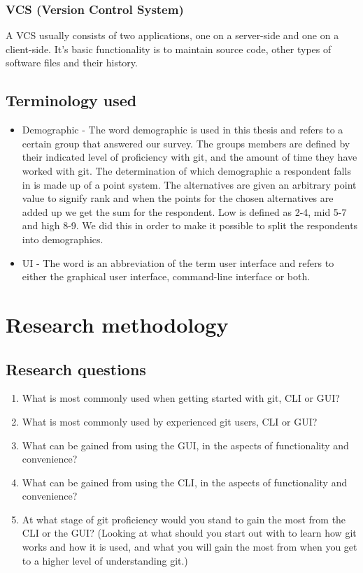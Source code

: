 \documentclass[a4paper,oneside]{bth} %
\begin{document}
			\subsection{VCS (Version Control System)}
			A VCS usually consists of two applications, one on a server-side and one on a client-side.
			It's basic functionality is to maintain source code, other types of software files and their history.\cite{FoundationVCforWebDevs}
			
			\section{Terminology used}
				\begin{itemize}
					\item Demographic - The word demographic is used in this thesis and refers to a certain group that answered our survey. The groups members are defined by their indicated level of proficiency with git, and the amount of time they have worked with git. The determination of which demographic a respondent falls in is made up of a point system. The alternatives are given an arbitrary point value to signify rank and when the points for the chosen alternatives are added up we get the sum for the respondent. Low is defined as 2-4, mid 5-7 and high 8-9. We did this in order to make it possible to split the respondents into demographics.
					\item UI - The word is an abbreviation of the term user interface and refers to either the graphical user interface, command-line interface or both.
				\end{itemize}
			
		\chapter{Research methodology}
			\section{Research questions}
			\begin{enumerate}
				\item What is most commonly used when getting started with git, CLI or GUI?
				\item What is most commonly used by experienced git users, CLI or GUI?
				\item What can be gained from using the GUI, in the aspects of functionality and convenience?
				\item What can be gained from using the CLI, in the aspects of functionality and convenience?
				\item At what stage of git proficiency would you stand to gain the most from the CLI or the GUI? (Looking at what should you start out with to learn how git works and how it is used, and what you will gain the most from when you get to a higher level of understanding git.)
			\end{enumerate}
		
\end{document}
